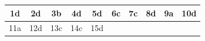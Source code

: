 \begin{table}[!ht]
\centering
\begin{tabular}{|c|c|c|c|c|c|c|c|c|c|}
\hline
1d & 2d & 3b & 4d & 5d & 6c & 7c & 8d & 9a & 10d \\ \hline
11a & 12d & 13c & 14c & 15d & & & & & \\ \hline
\end{tabular}
\end{table}

